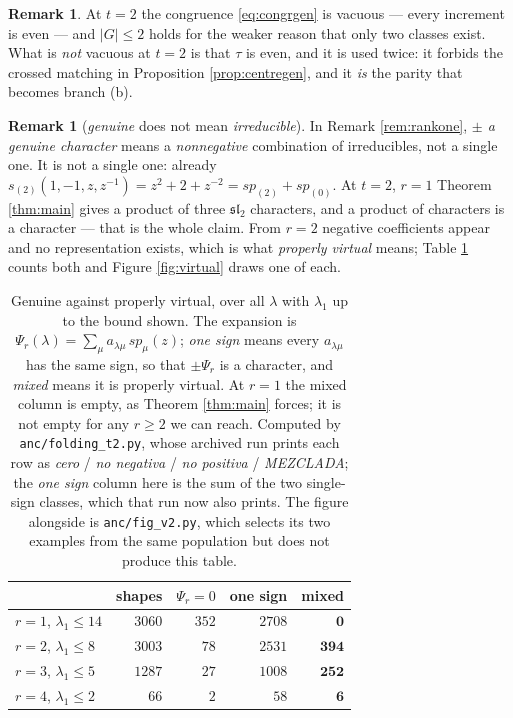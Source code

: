 \documentclass[11pt,reqno]{amsart}
\theoremstyle{plain}
\theoremstyle{definition}
\newtheorem{remark}[theorem]{Remark}
\begin{document}
\begin{remark}
At $t=2$ the congruence \eqref{eq:congrgen} is vacuous --- every increment is even --- and
$|G|\le2$ holds for the weaker reason that only two classes exist. What is \emph{not} vacuous at
$t=2$ is that $\tau$ is even, and it is used twice: it forbids the crossed matching in Proposition
\ref{prop:centregen}, and it \emph{is} the parity that becomes branch {\rm(b)}.
\end{remark}

\begin{remark}[\emph{genuine} does not mean \emph{irreducible}]
In Remark \ref{rem:rankone}, \emph{$\pm$ a genuine character} means a \emph{nonnegative} combination
of irreducibles, not a single one. It is not a single one: already
$s_{(2)}(1,-1,z,z^{-1})=z^{2}+2+z^{-2}=sp_{(2)}+sp_{(0)}$. At $t=2$, $r=1$ Theorem \ref{thm:main}
gives a product of three $\mathfrak{sl}_2$ characters, and a product of characters is a character ---
that is the whole claim. From $r=2$ negative coefficients appear and no representation exists, which
is what \emph{properly virtual} means; Table \ref{tab:virtual} counts both and Figure
\ref{fig:virtual} draws one of each.
\end{remark}

\begin{table}[!ht]
\centering\small
\caption{Genuine against properly virtual, over all $\lambda$ with $\lambda_1$ up to the bound shown.
The expansion is $\Psi_r(\lambda)=\sum_\mu a_{\lambda\mu}\,sp_\mu(z)$; \emph{one sign} means every
$a_{\lambda\mu}$ has the same sign, so that $\pm\Psi_r$ is a character, and \emph{mixed} means it is
properly virtual. At $r=1$ the mixed column is empty, as Theorem \ref{thm:main} forces; it is not
empty for any $r\ge2$ we can reach. Computed by \texttt{anc/folding\_t2.py}, whose archived run
prints each row as \emph{cero} / \emph{no negativa} / \emph{no positiva} / \emph{MEZCLADA}; the
\emph{one sign} column here is the sum of the two single-sign classes, which that run now also
prints. The figure alongside is \texttt{anc/fig\_v2.py}, which selects its two examples from the
same population but does not produce this table.}
\label{tab:virtual}
\begin{tabular}{@{}lrrrr@{}}
\toprule
 & \multicolumn{1}{c}{shapes} & \multicolumn{1}{c}{$\Psi_r=0$} & \multicolumn{1}{c}{one sign}
 & \multicolumn{1}{c}{mixed} \\
\midrule
\rowcolor{hband} $r=1$, $\lambda_1\le14$ & $3060$ & $352$ & $2708$ & \textcolor{hproved}{$\mathbf{0}$} \\
$r=2$, $\lambda_1\le8$  & $3003$ & $78$ & $2531$ & \textcolor{hverif}{$\mathbf{394}$} \\
$r=3$, $\lambda_1\le5$  & $1287$ & $27$ & $1008$ & \textcolor{hverif}{$\mathbf{252}$} \\
$r=4$, $\lambda_1\le2$  & $66$   & $2$  & $58$   & \textcolor{hverif}{$\mathbf{6}$} \\
\bottomrule
\end{tabular}
\end{table}
\end{document}
